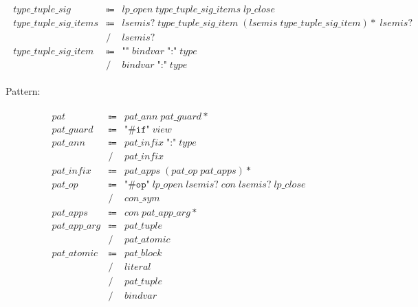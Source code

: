 \begin{align*}
    \begin{array}{rcll}
        \mathit{type\_tuple\_sig}
        &\Coloneq &\mathit{lp\_open}\; \mathit{type\_tuple\_sig\_items}\; \mathit{lp\_close} \\
        \mathit{type\_tuple\_sig\_items}
        &\Coloneq &\mathit{lsemis}{?}\; \mathit{type\_tuple\_sig\_item}\; (\mathit{lsemis}\; \mathit{type\_tuple\_sig\_item}){*}\; \mathit{lsemis}{?} \\
        &\mathrel{/} &\mathit{lsemis}{?} \\
        \mathit{type\_tuple\_sig\_item}
        &\Coloneq &\texttt{"\^{}"}\; \mathit{bindvar}\; \texttt{":"}\; \mathit{type} \\
        &\mathrel{/} &\mathit{bindvar}\; \texttt{":"}\; \mathit{type}
    \end{array}
\end{align*}

Pattern:

\begin{align*}
    \begin{array}{rcll}
        \mathit{pat}
        &\Coloneq &\mathit{pat\_ann}\; \mathit{pat\_guard}{*} \\
        \mathit{pat\_guard}
        &\Coloneq &\texttt{"\#if"}\; \mathit{view} \\
        \mathit{pat\_ann}
        &\Coloneq &\mathit{pat\_infix}\; \texttt{":"}\; \mathit{type} \\
        &\mathrel{/} &\mathit{pat\_infix} \\
        \mathit{pat\_infix}
        &\Coloneq &\mathit{pat\_apps}\; (\mathit{pat\_op}\; \mathit{pat\_apps}){*} \\
        \mathit{pat\_op}
        &\Coloneq &\texttt{"\#op"}\; \mathit{lp\_open}\; \mathit{lsemis}{?}\; \mathit{con}\; \mathit{lsemis}{?}\; \mathit{lp\_close} \\
        &\mathrel{/} &\mathit{con\_sym} \\
        \mathit{pat\_apps}
        &\Coloneq &\mathit{con}\; \mathit{pat\_app\_arg}{*} \\
        \mathit{pat\_app\_arg}
        &\Coloneq &\mathit{pat\_tuple} \\
        &\mathrel{/} &\mathit{pat\_atomic} \\
        \mathit{pat\_atomic}
        &\Coloneq &\mathit{pat\_block} \\
        &\mathrel{/} &\mathit{literal} \\
        &\mathrel{/} &\mathit{pat\_tuple} \\
        &\mathrel{/} &\mathit{bindvar}
    \end{array}
\end{align*}


